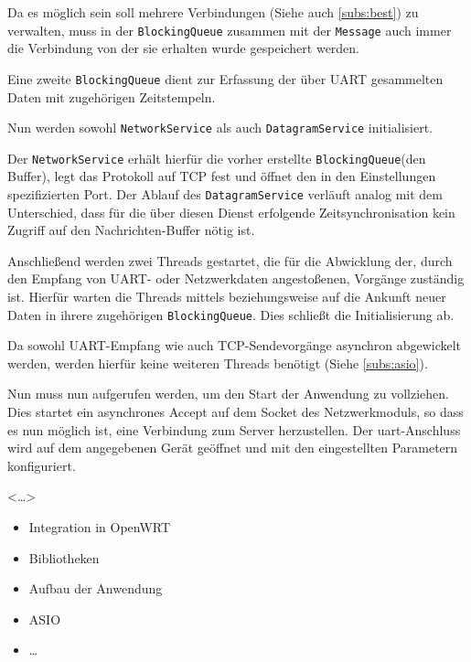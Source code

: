 Da es möglich sein soll mehrere Verbindungen (Siehe auch \autoref{subs:best}) zu
verwalten, muss in der \texttt{BlockingQueue} zusammen mit der \texttt{Message}
auch immer die Verbindung von der sie erhalten wurde gespeichert werden.

Eine zweite \texttt{BlockingQueue} dient zur Erfassung der über UART gesammelten
Daten mit zugehörigen Zeitstempeln. 

Nun werden sowohl \texttt{NetworkService} als auch \texttt{DatagramService}
initialisiert.

Der \texttt{NetworkService} erhält hierfür die vorher erstellte
\texttt{BlockingQueue}(den Buffer), legt das Protokoll auf TCP fest und
öffnet den in den Einstellungen spezifizierten Port. Der Ablauf des
\texttt{DatagramService} verläuft analog mit dem Unterschied, dass für die über
diesen Dienst erfolgende Zeitsynchronisation kein Zugriff auf den
Nachrichten-Buffer nötig ist.

Anschließend werden zwei Threads gestartet, die für die Abwicklung der, durch
den Empfang von UART- oder Netzwerkdaten angestoßenen, Vorgänge zuständig
ist. Hierfür warten die Threads mittels  beziehungsweise \newline{} auf die Ankunft neuer Daten in ihrere zugehörigen
\texttt{BlockingQueue}. Dies schließt die Initialisierung ab.

Da sowohl UART-Empfang wie auch TCP-Sendevorgänge asynchron
abgewickelt werden, werden hierfür keine weiteren Threads benötigt (Siehe
\autoref{subs:asio}). 

Nun muss nun  aufgerufen werden, um den Start der
Anwendung zu vollziehen. Dies startet ein asynchrones Accept auf dem Socket des
Netzwerkmoduls, so dass es nun möglich ist, eine Verbindung zum Server
herzustellen. Der \gls{uart}-Anschluss wird auf dem angegebenen Gerät geöffnet
und mit den eingestellten Parametern konfiguriert.

<\ldots>



\begin{itemize}
  \item Integration in OpenWRT
  \item Bibliotheken
  \item Aufbau der Anwendung
  \item ASIO
  \item \ldots
\end{itemize}
